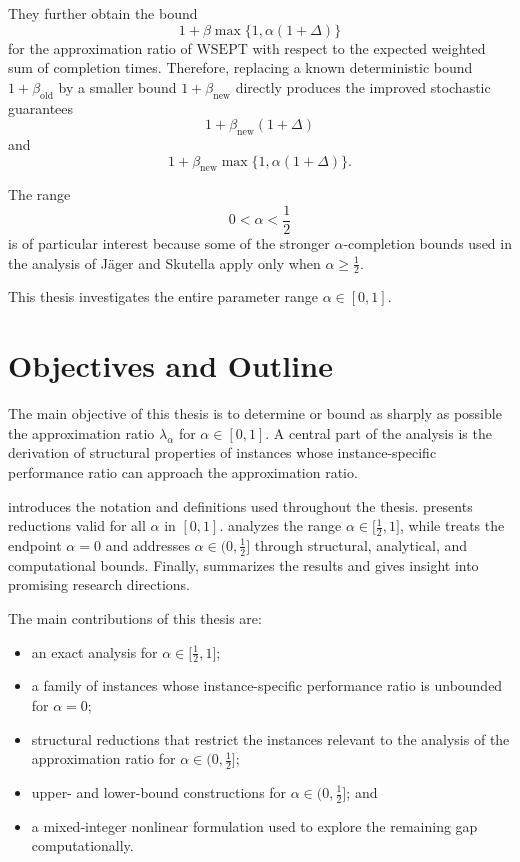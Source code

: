 \documentclass[%
english, titlepage=false %
]{./tum-templates/book/tumbook}
\begin{document}
They further obtain the bound
\[
    1+\beta\max\{1,\alpha(1+\Delta)\}
\]
for the approximation ratio of $\mathrm{WSEPT}$ with respect to the expected weighted sum of 
completion times. Therefore, replacing a known deterministic bound
\(1+\beta_{\mathrm{old}}\) by a smaller bound
\(1+\beta_{\mathrm{new}}\) directly produces the improved stochastic
guarantees
\[
    1+\beta_{\mathrm{new}}(1+\Delta)
\]
and
\[
    1+\beta_{\mathrm{new}}
       \max\{1,\alpha(1+\Delta)\}.
\]


The range
\[
    0<\alpha<\frac12
\]
is of particular interest because some of the stronger 
\(\alpha\)-completion bounds used in the analysis of Jäger and Skutella apply
only when \(\alpha\ge\frac12\). 

This thesis investigates the entire parameter range $\alpha \in [0,1]$.

\section*{Objectives and Outline}

The main objective of this thesis is to determine or bound as sharply
as possible the approximation ratio $\lambda_{\alpha}$ for $\alpha \in [0,1]$. 
A central part of the analysis is the derivation of
structural properties of instances whose instance-specific performance ratio
can approach the approximation ratio.

 introduces the notation and definitions used throughout the thesis.
 presents reductions valid for all $\alpha$ in $[0,1]$.
 analyzes the range $\alpha\in \Big[\frac12,1\Big]$, while 
treats the endpoint $\alpha=0$ and addresses $\alpha\in\Big(0,\frac12\Big]$ through structural,
analytical, and computational bounds. Finally,
 summarizes the results and gives insight into 
promising research directions.

The main contributions of this thesis are:
\begin{itemize}
    \item an exact analysis for $\alpha\in\Big[\frac12,1\Big]$;
    \item a family of instances whose instance-specific performance ratio is unbounded  for $\alpha=0$;
    \item structural reductions that restrict the instances relevant to the analysis of the approximation ratio for $\alpha\in\Big(0,\frac12\Big]$;
    \item upper- and lower-bound constructions for $\alpha\in\Big(0,\frac12\Big]$; and
    \item a mixed-integer nonlinear formulation used to explore the remaining gap computationally.
\end{itemize}
\end{document}
